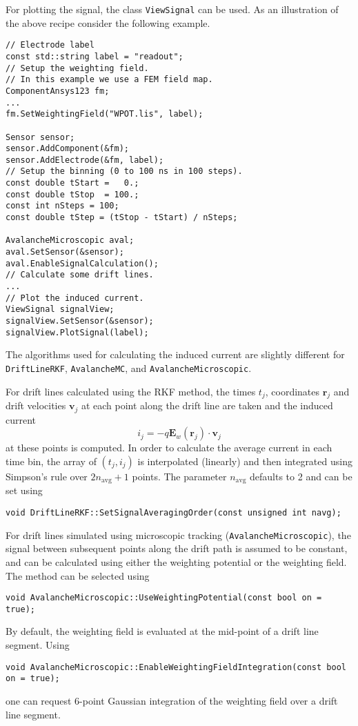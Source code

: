 For plotting the signal, the class \texttt{ViewSignal} can be used.
As an illustration of the above recipe consider the following example. 
\begin{lstlisting}
// Electrode label
const std::string label = "readout";
// Setup the weighting field.
// In this example we use a FEM field map.
ComponentAnsys123 fm;
...
fm.SetWeightingField("WPOT.lis", label);

Sensor sensor;
sensor.AddComponent(&fm);
sensor.AddElectrode(&fm, label);
// Setup the binning (0 to 100 ns in 100 steps).
const double tStart =   0.;
const double tStop  = 100.;
const int nSteps = 100;
const double tStep = (tStop - tStart) / nSteps;

AvalancheMicroscopic aval;
aval.SetSensor(&sensor);
aval.EnableSignalCalculation();
// Calculate some drift lines.
...
// Plot the induced current.
ViewSignal signalView;
signalView.SetSensor(&sensor);
signalView.PlotSignal(label);
\end{lstlisting}

The algorithms used for calculating the induced current are slightly different 
for \texttt{DriftLineRKF}, \texttt{AvalancheMC}, and \texttt{AvalancheMicroscopic}.

For drift lines calculated using the RKF method, 
the times $t_j$, coordinates $\mathbf{r}_j$ and drift velocities $\mathbf{v}_j$
at each point along the drift line are taken and the induced current 
\begin{equation*}
  i_{j} = -q \mathbf{E}_{w}\left(\mathbf{r}_{j}\right) \cdot \mathbf{v}_j
\end{equation*}
at these points is computed. In order to calculate the average current 
in each time bin, the array of $\left(t_{j}, i_{j}\right)$ is interpolated 
(linearly) and then integrated using Simpson's rule over $2n_\text{avg} + 1$ points. The parameter $n_\text{avg}$ defaults to 2 and can be set using
\begin{lstlisting}
void DriftLineRKF::SetSignalAveragingOrder(const unsigned int navg);
\end{lstlisting} 

For drift lines simulated using microscopic tracking 
(\texttt{AvalancheMicroscopic}), the signal between subsequent points 
along the drift path is assumed to be constant, and can be 
calculated using either the weighting potential or the weighting field. 
The method can be selected using 
\begin{lstlisting}
void AvalancheMicroscopic::UseWeightingPotential(const bool on = true);
\end{lstlisting}
By default, the weighting field is evaluated at the mid-point of a 
drift line segment. 
Using 
\begin{lstlisting}
void AvalancheMicroscopic::EnableWeightingFieldIntegration(const bool on = true);
\end{lstlisting} 
one can request 6-point Gaussian integration of the weighting field 
over a drift line segment.

